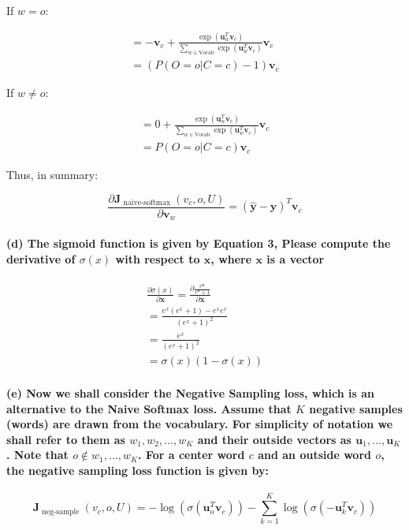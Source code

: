\documentclass[12pt, letterpaper]{article}
\newcommand{\uxvc}[1]{\boldsymbol{u}_{#1}^{T} \boldsymbol{v}_{c}}
\newcommand{\expuxvc}[1]{\exp {\left(\uxvc{#1}\right)}}
\newcommand{\Jsoftmax}{\boldsymbol{J}_{\text { naive-softmax }}\left(v_{c}, o, U\right)} %
\newcommand{\Jnegsampling}{\boldsymbol{J}_{\text { neg-sample }}\left(v_{c}, o, U\right)} %
\newcommand{\negsamploss}{-\log \left(\sigma\left(\boldsymbol{u}_{o}^{T} \boldsymbol{v}_{c}\right)\right)-\sum_{k=1}^{K} \log \left(\sigma\left(-\boldsymbol{u}_{k}^{T} \boldsymbol{v}_{c}\right)\right)}
\newcommand{\sigmoidD}[1]{\sigma(#1)(1 - \sigma(#1))}
\newcommand{\partialD}[2]{\frac{\partial #1}{\partial #2}}
\begin{document}
If $w = o$:

\begin{align*}
    = -\boldsymbol{v}_c + \frac{\expuxvc{w}}{\sum_{w \in \mathrm{Vocab}} \expuxvc{w}} \boldsymbol{v}_c \\
    = (P(O=o|C=c) - 1) \boldsymbol{v}_c
\end{align*}

If $w \neq o$:

\begin{align*}
    = 0 + \frac{\expuxvc{w}}{\sum_{w \in \mathrm{Vocab}} \expuxvc{w}} \boldsymbol{v}_c \\
    = P(O=o|C=c) \boldsymbol{v}_c
\end{align*}

Thus, in summary:

\begin{equation*}
    \partialD{\Jsoftmax}{\boldsymbol{v}_{w}} = (\hat{\boldsymbol{y}} - \boldsymbol{y})^T \boldsymbol{v}_c
\end{equation*}


\paragraph{(d) The sigmoid function is given by Equation 3, Please compute the derivative of $\sigma(x)$ with respect to $\boldsymbol{x}$, where $\boldsymbol{x}$ is a vector}

\begin{align*}
    \partialD{\sigma(x)}{\boldsymbol{x}} = \partialD{\frac{e^{\boldsymbol{x}}}{e^{\boldsymbol{x}}+1}}{\boldsymbol{x}} \\
    = \frac{e^x(e^x+1) - e^x e^x}{(e^x + 1)^2} \\
    = \frac{e^x}{(e^x + 1)^2} \\
    = \sigmoidD{x}
\end{align*}


\paragraph{(e) Now we shall consider the Negative Sampling loss, which is an alternative to the Naive Softmax loss. Assume that $K$ negative samples (words) are drawn from the vocabulary. For simplicity of notation we shall refer to them as $w_1,w_2,\dots,w_K$ and their outside vectors as $\boldsymbol{u}_1,...,\boldsymbol{u}_K$. Note that $o \notin {w_1,...,w_K}$. For a center word $c$ and an outside word $o$, the negative sampling loss function is given by:}
\begin{equation}
    \Jnegsampling = \negsamploss
\end{equation}
\end{document}

